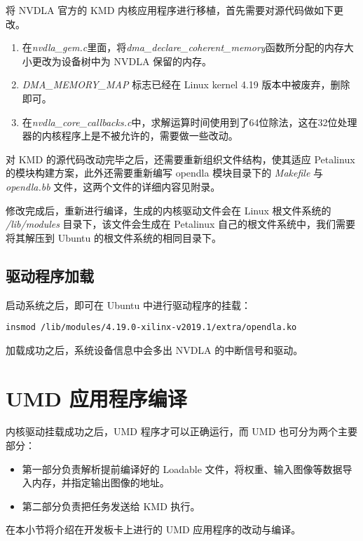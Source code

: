 将 NVDLA 官方的 KMD 内核应用程序进行移植，首先需要对源代码做如下更改。

\begin{enumerate}
    \item 在\emph{nvdla\_gem.c}里面，将\emph{dma\_declare\_coherent\_memory}函数所分配的内存大小更改为设备树中为 NVDLA 保留的内存。
    \item \emph{DMA\_MEMORY\_MAP } 标志已经在 Linux kernel 4.19 版本中被废弃，删除即可。
    \item 在\emph{nvdla\_core\_callbacks.c}中，求解运算时间使用到了64位除法，这在32位处理器的内核程序上是不被允许的，需要做一些改动。
\end{enumerate}

对 KMD 的源代码改动完毕之后，还需要重新组织文件结构，使其适应 Petalinux 的模块构建方案，此外还需要重新编写 opendla 模块目录下的 \emph{Makefile} 与 \emph{opendla.bb} 文件，这两个文件的详细内容见附录。

修改完成后，重新进行编译，生成的内核驱动文件会在 Linux 根文件系统的 \emph{/lib/modules} 目录下，该文件会生成在 Petalinux 自己的根文件系统中，我们需要将其解压到 Ubuntu 的根文件系统的相同目录下。

\subsection{驱动程序加载}

启动系统之后，即可在 Ubuntu 中进行驱动程序的挂载：

\begin{lstlisting}
insmod /lib/modules/4.19.0-xilinx-v2019.1/extra/opendla.ko 
\end{lstlisting}

加载成功之后，系统设备信息中会多出 NVDLA 的中断信号和驱动。

\section{UMD 应用程序编译}

内核驱动挂载成功之后，UMD 程序才可以正确运行，而 UMD 也可分为两个主要部分：

\begin{itemize}
    \item 第一部分负责解析提前编译好的 Loadable 文件，将权重、输入图像等数据导入内存，并指定输出图像的地址。
    \item 第二部分负责把任务发送给 KMD 执行。
\end{itemize}

在本小节将介绍在开发板卡上进行的 UMD 应用程序的改动与编译。


